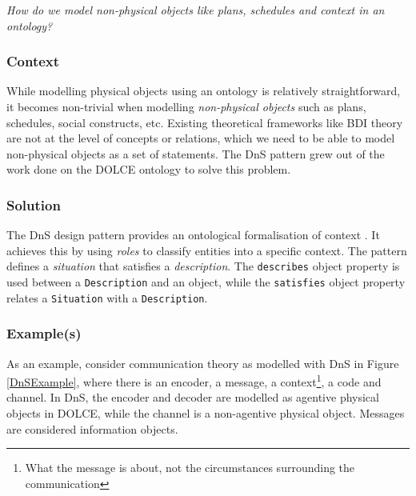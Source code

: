 \emph{How do we model non-physical objects like plans, schedules and context in an ontology?}

\subsubsection{Context}

While modelling physical objects using an ontology is relatively straightforward, it becomes non-trivial when modelling \emph{non-physical objects} \cite{Gangemi2003} such as plans, schedules, social constructs, etc. Existing theoretical frameworks like \ac{BDI} theory \cite{Bratman1987} are not at the level of concepts or relations, which we need to be able to model non-physical objects as a set of statements. The \ac{DnS} pattern grew out of the work done on the \ac{DOLCE} ontology to solve this problem.


\subsubsection{Solution}

The \ac{DnS} design pattern provides an ontological formalisation of context \cite{Scherp2011}. It achieves this by using \emph{roles} to classify entities into a specific context. The pattern defines a \emph{situation} that satisfies a \emph{description}. The \texttt{describes} object property is used between a \texttt{Description} and an object, while the \texttt{satisfies} object property relates a \texttt{Situation} with a \texttt{Description}.

\subsubsection{Example(s)}



As an example, consider communication theory \cite{Shannon} as modelled with \ac{DnS} in Figure \ref{DnSExample}, where there is an encoder, a message, a context\footnote{What the message is about, not the circumstances surrounding the communication}, a code and channel. In \ac{DnS}, the encoder and decoder are modelled as agentive physical objects in \ac{DOLCE}, while the channel is a non-agentive physical object. Messages are considered information objects. 



